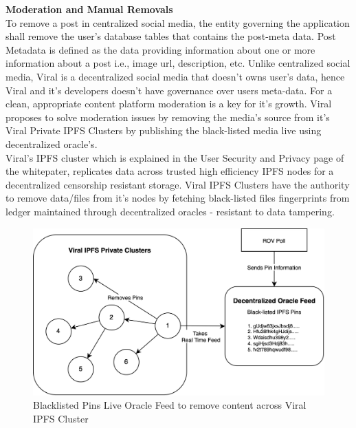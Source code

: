 \documentclass[10pt]{article}
\begin{document}
\textbf{Moderation and Manual Removals}\\

To remove a post in centralized social media, the entity governing the application shall remove the user's database tables that contains the post-meta data. Post Metadata is defined as the data providing information about one or more information about a post i.e., image url, description, etc. Unlike centralized social media, Viral is a decentralized social media that doesn't owns user's data, hence Viral and it's developers doesn't have governance over users meta-data. For a clean, appropriate content platform moderation is a key for it's growth. Viral proposes to solve moderation issues by removing the media's source from it's Viral Private IPFS Clusters by publishing the black-listed media live using decentralized oracle's.\\

Viral's IPFS cluster which is explained in the User Security and Privacy page of the whitepater, replicates data across trusted high efficiency IPFS nodes for a decentralized censorship resistant storage. Viral IPFS Clusters have the authority to remove data/files from it's nodes by fetching black-listed files fingerprints from ledger maintained through decentralized oracles - resistant to data tampering.\\

\begin{figure}[H]
\begin{center}
\includegraphics[width=12cm]{content-removal}
\end{center}
\caption{Blacklisted Pins Live Oracle Feed to remove content across Viral IPFS Cluster}
\end{figure}
\end{document}

